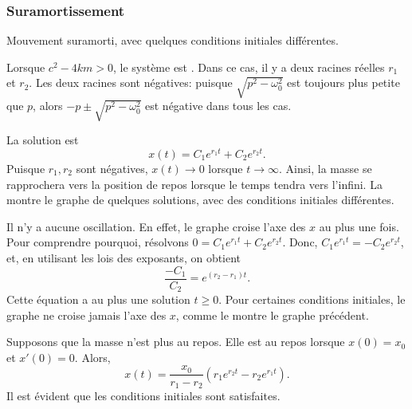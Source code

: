 \subsubsection{Suramortissement}

\begin{mywrapfig}[15]{3.25in}
\capstart
{}
\caption{Mouvement suramorti, avec quelques conditions initiales différentes.\label{mv:overdampedfig}}
\end{mywrapfig}
%
%

Lorsque $c^2 - 4km > 0$, le système est \emph{}.  
Dans ce cas, il y a deux racines réelles $r_1$ et $r_2$.  
Les deux racines sont négatives:   puisque $\sqrt{p^2 - \omega_0^2}$ est toujours plus petite que $p$,
alors $-p \pm \sqrt{p^2 - \omega_0^2}$ est négative dans tous les cas.


La solution est 
\begin{equation*}
	x(t) = C_1 e^{r_1 t} + C_2 e^{r_2 t} .
\end{equation*}
Puisque  $r_1, r_2$ sont négatives, $x(t) \to 0$ lorsque $t \to \infty$.
Ainsi, la masse se rapprochera vers la position de repos lorsque le temps tendra vers l'infini. 
La  montre 
le graphe de quelques solutions, avec des conditions initiales différentes.


Il n'y a aucune oscillation. En effet, le graphe croise l'axe des 
$x$ au plus une fois.  Pour comprendre pourquoi, résolvons 
$0 = C_1 e^{r_1 t} + C_2 e^{r_2 t}$.
Donc, $C_1 e^{r_1 t} = - C_2 e^{r_2 t}$, et, en utilisant les lois des exposants, on obtient  
\begin{equation*}
	\frac{-C_1}{C_2} = e^{(r_2-r_1) t} .
\end{equation*}
Cette équation a au plus une solution  $t \geq 0$.  
Pour certaines conditions initiales, le graphe ne croise jamais l'axe des $x$, 
comme le montre le graphe précédent. 

\begin{example}
	Supposons que la masse n'est plus au repos. Elle est au repos lorsque   
	$x(0) = x_0$ et $x'(0) = 0$.
	Alors,
	\begin{equation*}
		x(t) = \frac{x_0}{r_1-r_2} \left(r_1 e^{r_2 t} - r_2 e^{r_1 t} \right) .
	\end{equation*}
	Il est évident que les conditions initiales sont satisfaites.
\end{example}



